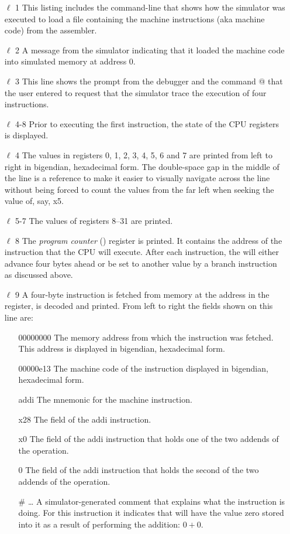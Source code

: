 \begin{itemize}
\item [$\ell$ 1] This listing includes the command-line that shows how the simulator
	was executed to load a file containing the machine instructions (aka
	machine code) from the assembler.
\item [$\ell$ 2] A message from the simulator indicating that it loaded the machine
	code into simulated memory at address 0.
\item [$\ell$ 3] This line shows the prompt from the debugger and the command
	@ that the user entered to request that the simulator trace 
	the execution of four instructions.
\item [$\ell$ 4-8] Prior to executing the first instruction, the state of the
	CPU registers is displayed.  
\item [$\ell$ 4] The values in registers 0, 1, 2, 3, 4, 5, 6 and 7 are printed 
	from left to right in \gls{bigendian}, \gls{hexadecimal} form.  
	The double-space gap in the middle of the line is a reference 
	to make it easier to visually navigate across the line without being
	forced to count the values from the far left when seeking the value 
	of, say, x5.
\item [$\ell$ 5-7] The values of registers 8--31 are printed.
\item [$\ell$ 8] The {\em program counter} () register is printed.  
	It contains the address of the instruction that the CPU will execute.  
	After each instruction, the  will either advance four bytes 
	ahead or be set to another value by a branch instruction as discussed above.
\item [$\ell$ 9] A four-byte instruction is fetched from memory at the address
	in the  register, is decoded and printed.  From left to right
	the fields shown on this line are:

	\begin{itemize}

	\item [00000000] The memory address from which the instruction was
		fetched.  This address is displayed in \gls{bigendian},
		\gls{hexadecimal} form.
	\item [00000e13] The machine code of the instruction displayed in 
		\gls{bigendian}, \gls{hexadecimal} form.
	\item [addi] The mnemonic for the machine instruction.
	\item [x28] The  field of the addi instruction.  
	\item [x0] The  field of the addi instruction that
		holds one of the two addends of the operation.
	\item [0] The  field of the addi instruction that
		holds the second of the two addends of the operation.
	\item [\# \ldots] A simulator-generated comment that explains
		what the instruction is doing.  For this instruction it indicates 
		that  will have the value zero stored into it as a result 
		of performing the addition: $0+0$.
	\end{itemize}


\end{itemize}
